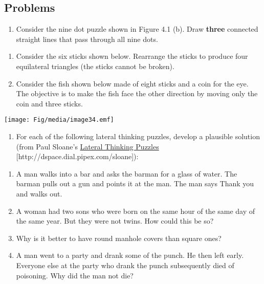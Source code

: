 \subsection{Problems}\label{problems}

\begin{enumerate}
\def\labelenumi{\arabic{enumi}.}
\item
  Consider the nine dot puzzle shown in Figure 4.1 (b). Draw
  \textbf{three} connected straight lines that pass through all nine
  dots.
\end{enumerate}

\begin{enumerate}
\def\labelenumi{\arabic{enumi}.}
\item
  Consider the six sticks shown below. Rearrange the sticks to produce
  four equilat­eral triangles (the sticks cannot be broken).
\item
  Consider the fish shown below made of eight sticks and a coin for the
  eye. The objective is to make the fish face the other direction by
  moving only the coin and three sticks.
\end{enumerate}

\texttt{[image: Fig/media/image34.emf]}

\begin{enumerate}
\def\labelenumi{\arabic{enumi}.}
\setcounter{enumi}{2}
\item
  For each of the following lateral thinking puzzles, develop a
  plausible solution (from Paul Sloane's \ul{Lateral Thinking Puzzles}
  {[}http://dspace.dial.pipex.com/sloane{]}):
\end{enumerate}

\begin{enumerate}
\def\labelenumi{\alph{enumi}.}
\item
  A man walks into a bar and asks the barman for a glass of water. The
  barman pulls out a gun and points it at the man. The man says
  \textquotesingle Thank you\textquotesingle{} and walks out.
\item
  A woman had two sons who were born on the same hour of the same day of
  the same year. But they were not twins. How could this be so?
\item
  Why is it better to have round manhole covers than square ones?
\item
  A man went to a party and drank some of the punch. He then left early.
  Everyone else at the party who drank the punch subsequently died of
  poisoning. Why did the man not die?
\end{enumerate}

